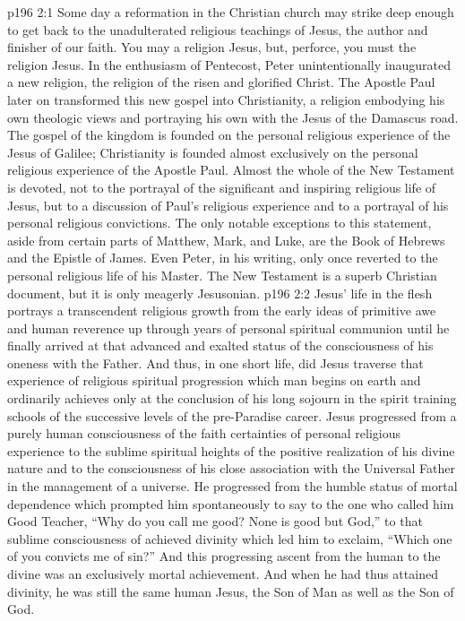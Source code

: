 \vs p196 2:1 Some day a reformation in the Christian church may strike deep enough to get back to the unadulterated religious teachings of Jesus, the author and finisher of our faith. You may  a religion  Jesus, but, perforce, you must  the religion  Jesus. In the enthusiasm of Pentecost, Peter unintentionally inaugurated a new religion, the religion of the risen and glorified Christ. The Apostle Paul later on transformed this new gospel into Christianity, a religion embodying his own theologic views and portraying his own  with the Jesus of the Damascus road. The gospel of the kingdom is founded on the personal religious experience of the Jesus of Galilee; Christianity is founded almost exclusively on the personal religious experience of the Apostle Paul. Almost the whole of the New Testament is devoted, not to the portrayal of the significant and inspiring religious life of Jesus, but to a discussion of Paul’s religious experience and to a portrayal of his personal religious convictions. The only notable exceptions to this statement, aside from certain parts of Matthew, Mark, and Luke, are the Book of Hebrews and the Epistle of James. Even Peter, in his writing, only once reverted to the personal religious life of his Master. The New Testament is a superb Christian document, but it is only meagerly Jesusonian.
\vs p196 2:2 Jesus’ life in the flesh portrays a transcendent religious growth from the early ideas of primitive awe and human reverence up through years of personal spiritual communion until he finally arrived at that advanced and exalted status of the consciousness of his oneness with the Father. And thus, in one short life, did Jesus traverse that experience of religious spiritual progression which man begins on earth and ordinarily achieves only at the conclusion of his long sojourn in the spirit training schools of the successive levels of the pre\hyp{}Paradise career. Jesus progressed from a purely human consciousness of the faith certainties of personal religious experience to the sublime spiritual heights of the positive realization of his divine nature and to the consciousness of his close association with the Universal Father in the management of a universe. He progressed from the humble status of mortal dependence which prompted him spontaneously to say to the one who called him Good Teacher, \textcolor{ubdarkred}{“Why do you call me good? None is good but God,”} to that sublime consciousness of achieved divinity which led him to exclaim, \textcolor{ubdarkred}{“Which one of you convicts me of sin?”} And this progressing ascent from the human to the divine was an exclusively mortal achievement. And when he had thus attained divinity, he was still the same human Jesus, the Son of Man as well as the Son of God.
